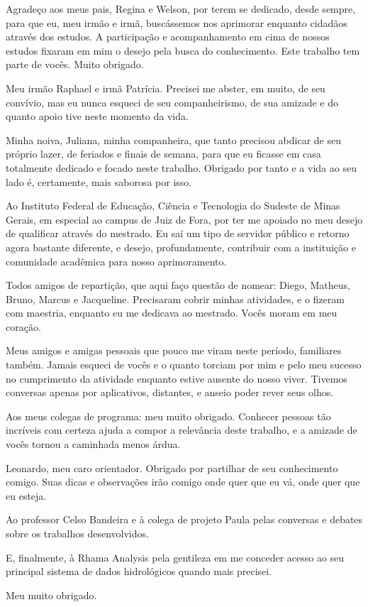 \documentclass[
        oneside,      %
        english,			
        brazil			 
        ]{abntbibufjf}
\begin{document}
\begin{agradecimentos}
Agradeço aos meus pais, Regina e Welson, por terem se dedicado, desde sempre, para que eu, meu irmão e irmã, buscássemos nos aprimorar enquanto cidadãos através dos estudos. A participação e acompanhamento em cima de nossos estudos fixaram em mim o desejo pela busca do conhecimento. Este trabalho tem parte de vocês. Muito obrigado.

Meu irmão Raphael e irmã Patrícia. Precisei me abster, em muito, de seu convívio, mas eu nunca esqueci de seu companheirismo, de sua amizade e do quanto apoio tive neste momento da vida.

Minha noiva, Juliana, minha companheira, que tanto precisou abdicar de seu próprio lazer, de feriados e finais de semana, para que eu ficasse em casa totalmente dedicado e focado neste trabalho. Obrigado por tanto e a vida ao seu lado é, certamente, mais saborosa por isso.

Ao Instituto Federal de Educação, Ciência e Tecnologia do Sudeste de Minas Gerais, em especial ao campus de Juiz de Fora, por ter me apoiado no meu desejo de qualificar através do mestrado. Eu saí um tipo de servidor público e retorno agora bastante diferente, e desejo, profundamente, contribuir com a instituição e comunidade acadêmica para nosso aprimoramento.

Todos amigos de repartição, que aqui faço questão de nomear: Diego, Matheus, Bruno, Marcus e Jacqueline. Precisaram cobrir minhas atividades, e o fizeram com maestria, enquanto eu me dedicava ao mestrado. Vocês moram em meu coração.

Meus amigos e amigas pessoais que pouco me viram neste período, familiares também. Jamais esqueci de vocês e o quanto torciam por mim e pelo meu sucesso no cumprimento da atividade enquanto estive ausente do nosso viver. Tivemos conversas apenas por aplicativos, distantes, e anseio poder rever seus olhos.

Aos meus colegas de programa: meu muito obrigado. Conhecer pessoas tão incríveis com certeza ajuda a compor a relevância deste trabalho, e a amizade de vocês tornou a caminhada menos árdua.

Leonardo, meu caro orientador. Obrigado por partilhar de seu conhecimento comigo. Suas dicas e observações irão comigo onde quer que eu vá, onde quer que eu esteja.

Ao professor Celso Bandeira e à colega de projeto Paula pelas conversas e debates sobre os trabalhos desenvolvidos.

E, finalmente, à Rhama Analysis pela gentileza em me conceder acesso ao seu principal sistema de dados hidrológicos quando mais precisei.

Meu muito obrigado.
\end{agradecimentos}
\end{document}
